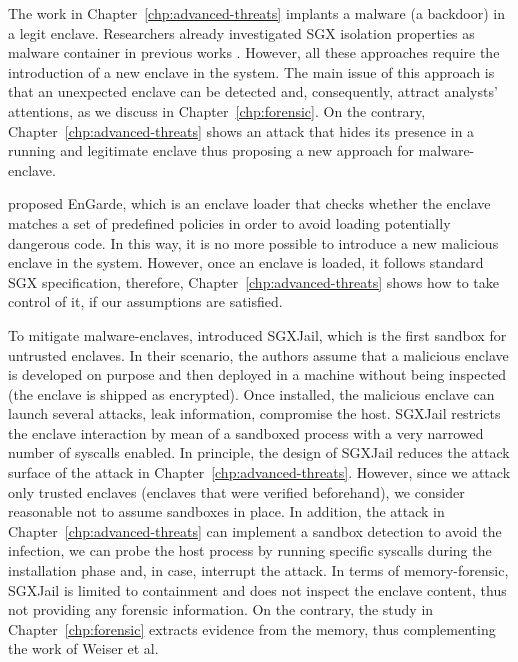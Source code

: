 The work in Chapter~\ref{chp:advanced-threats} implants a malware (\ie a 
backdoor) in a legit enclave.
Researchers already investigated SGX isolation properties as malware container
in previous
works 
\citep{thoughs-on-intel1,thoughs-on-intel2,davenport2014sgx,amsterdamsgxmalwer,schwarz2017malware,schwarz2018good,sgx-rop}.
However, all these approaches require the introduction of a new enclave in the 
system.
The main issue of this approach is that an unexpected enclave can be detected
and, consequently, attract analysts' attentions, as we discuss in 
Chapter~\ref{chp:forensic}.
On the contrary, Chapter~\ref{chp:advanced-threats} shows an attack that hides 
its presence in a running and legitimate enclave thus proposing a new approach 
for malware-enclave.

\cite{7980210} proposed EnGarde, which is an enclave loader that checks whether 
the enclave matches a set of predefined policies in order to avoid loading 
potentially dangerous code.
In this way, it is no more possible to introduce a new malicious enclave in the 
system.
However, once an enclave is loaded, it follows standard SGX specification, 
therefore, Chapter~\ref{chp:advanced-threats} shows how to take control of it, 
if our assumptions are satisfied.

To mitigate malware-enclaves, \cite{sgxjail} introduced 
SGXJail, which is the first sandbox for untrusted enclaves.
In their scenario, the authors assume that a malicious enclave is developed on 
purpose and then deployed in a machine without being inspected (\eg the enclave 
is shipped as encrypted).
Once installed, the malicious enclave can launch several attacks, \eg leak 
information, compromise the host.
SGXJail restricts the enclave interaction by mean of a sandboxed process with 
a very narrowed number of syscalls enabled.
In principle, the design of SGXJail reduces the attack surface of the attack in 
Chapter~\ref{chp:advanced-threats}.
However, since we attack only trusted enclaves (\ie enclaves that were 
verified beforehand), we consider reasonable not to assume sandboxes in place.
In addition, the attack in Chapter~\ref{chp:advanced-threats} can implement a 
sandbox detection to avoid the infection, \ie we can probe the host process by 
running specific syscalls during the installation phase and, in case, interrupt 
the attack.
In terms of memory-forensic, SGXJail is limited to containment and does not 
inspect the enclave content, thus not providing any forensic information.
On the contrary, the study in Chapter~\ref{chp:forensic} extracts evidence from 
the memory, thus complementing the work of Weiser et al.

